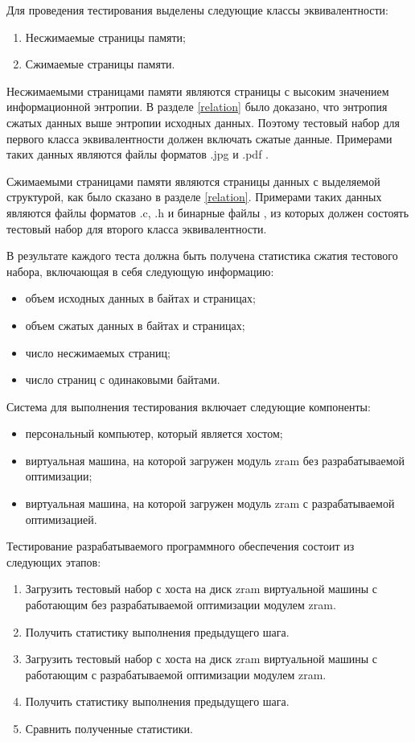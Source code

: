Для проведения тестирования выделены следующие классы эквивалентности:

\begin{enumerate}
	\item Несжимаемые страницы памяти;
	\item Сжимаемые страницы памяти.
\end{enumerate}

Несжимаемыми страницами памяти являются страницы с высоким значением информационной энтропии. В разделе \ref{relation} было доказано, что энтропия сжатых данных выше энтропии исходных данных. Поэтому тестовый набор для первого класса эквивалентности должен включать сжатые данные. Примерами таких данных являются файлы форматов .jpg и .pdf \cite{formats}.

Сжимаемыми страницами памяти являются страницы данных с выделяемой структурой, как было сказано в разделе \ref{relation}. Примерами таких данных являются файлы форматов .c, .h и бинарные файлы \cite{good-compression}, из которых должен состоять тестовый набор для второго класса эквивалентности.

В результате каждого теста должна быть получена статистика сжатия тестового набора, включающая в себя следующую информацию:

\begin{itemize}
	\item объем исходных данных в байтах и страницах;
	\item объем сжатых данных в байтах и страницах;
	\item число несжимаемых страниц;
	\item число страниц с одинаковыми байтами.
\end{itemize}

Система для выполнения тестирования включает следующие компоненты:

\begin{itemize}
	\item персональный компьютер, который является хостом;
	\item виртуальная машина, на которой загружен модуль zram без разрабатываемой оптимизации;
	\item виртуальная машина, на которой загружен модуль zram с разрабатываемой оптимизацией.
\end{itemize}

Тестирование разрабатываемого программного обеспечения состоит из следующих этапов:

\begin{enumerate}
	\item Загрузить тестовый набор с хоста на диск zram виртуальной машины с работающим без разрабатываемой оптимизации модулем zram.
	\item Получить статистику выполнения предыдущего шага.
	\item Загрузить тестовый набор с хоста на диск zram виртуальной машины с работающим с разрабатываемой оптимизации модулем zram.
	\item Получить статистику выполнения предыдущего шага.
	\item Сравнить полученные статистики.
\end{enumerate}

